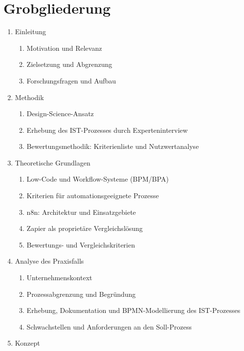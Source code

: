 ﻿\documentclass[a4paper,11pt]{article}
\begin{document}
\section{Grobgliederung}
\renewcommand{\labelenumi}{\arabic{enumi}.}
\renewcommand{\labelenumii}{\arabic{enumi}.\arabic{enumii}.}
\begin{enumerate}
    \item Einleitung
    \begin{enumerate}
        \item Motivation und Relevanz
        \item Zielsetzung und Abgrenzung
        \item Forschungsfragen und Aufbau
    \end{enumerate}
    \item Methodik
    \begin{enumerate}
        \item Design-Science-Ansatz
        \item Erhebung des IST-Prozesses durch Experteninterview
        \item Bewertungsmethodik: Kriterienliste und Nutzwertanalyse
    \end{enumerate}
    \item Theoretische Grundlagen
    \begin{enumerate}
        \item Low-Code und Workflow-Systeme (BPM/BPA)
        \item Kriterien für automationsgeeignete Prozesse
        \item n8n: Architektur und Einsatzgebiete
        \item Zapier als proprietäre Vergleichslösung
        \item Bewertungs- und Vergleichskriterien
    \end{enumerate}
    \item Analyse des Praxisfalls
    \begin{enumerate}
        \item Unternehmenskontext
        \item Prozessabgrenzung und Begründung
        \item Erhebung, Dokumentation und BPMN-Modellierung des IST-Prozesses
        \item Schwachstellen und Anforderungen an den Soll-Prozess
    \end{enumerate}
    \item Konzept
    \begin{enumerate}

\end{enumerate}
\end{enumerate}
\end{document}
